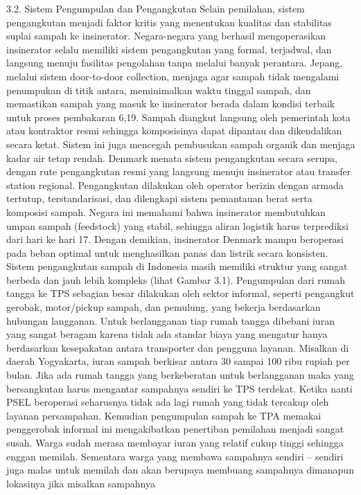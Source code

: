 \documentclass[
  letterpaper,
  DIV=11,
  numbers=noendperiod]{scrreprt}
\begin{document}
3.2. Sistem Pengumpulan dan Pengangkutan Selain pemilahan, sistem
pengangkutan menjadi faktor kritis yang menentukan kualitas dan
stabilitas suplai sampah ke insinerator. Negara-negara yang berhasil
mengoperasikan insinerator selalu memiliki sistem pengangkutan yang
formal, terjadwal, dan langsung menuju fasilitas pengolahan tanpa
melalui banyak perantara. Jepang, melalui sistem door-to-door
collection, menjaga agar sampah tidak mengalami penumpukan di titik
antara, meminimalkan waktu tinggal sampah, dan memastikan sampah yang
masuk ke insinerator berada dalam kondisi terbaik untuk proses
pembakaran 6,19. Sampah diangkut langsung oleh pemerintah kota atau
kontraktor resmi sehingga komposisinya dapat dipantau dan dikendalikan
secara ketat. Sistem ini juga mencegah pembusukan sampah organik dan
menjaga kadar air tetap rendah. Denmark menata sistem pengangkutan
secara serupa, dengan rute pengangkutan resmi yang langsung menuju
insinerator atau transfer station regional. Pengangkutan dilakukan oleh
operator berizin dengan armada tertutup, terstandarisasi, dan dilengkapi
sistem pemantauan berat serta komposisi sampah. Negara ini memahami
bahwa insinerator membutuhkan umpan sampah (feedstock) yang stabil,
sehingga aliran logistik harus terprediksi dari hari ke hari 17. Dengan
demikian, insinerator Denmark mampu beroperasi pada beban optimal untuk
menghasilkan panas dan listrik secara konsisten. Sistem pengangkutan
sampah di Indonesia masih memiliki struktur yang sangat berbeda dan jauh
lebih kompleks (lihat Gambar 3.1). Pengumpulan dari rumah tangga ke TPS
sebagian besar dilakukan oleh sektor informal, seperti pengangkut
gerobak, motor/pickup sampah, dan pemulung, yang bekerja berdasarkan
hubungan langganan. Untuk berlangganan tiap rumah tangga dibebani iuran
yang sangat beragam karena tidak ada standar biaya yang mengatur hanya
berdasarkan kesepakatan antara transporter dan pengguna layanan.
Misalkan di daerah Yogyakarta, iuran sampah berkisar antara 30 sampai
100 ribu rupiah per bulan. Jika ada rumah tangga yang berkeberatan untuk
berlangganan maka yang bersangkutan harus mengantar sampahnya sendiri ke
TPS terdekat. Ketika nanti PSEL beroperasi seharusnya tidak ada lagi
rumah yang tidak tercakup oleh layanan persampahan. Kemudian pengumpulan
sampah ke TPA memakai penggerobak informal ini mengakibatkan penertiban
pemilahan menjadi sangat susah. Warga sudah merasa membayar iuran yang
relatif cukup tinggi sehingga enggan memilah. Sementara warga yang
membawa sampahnya sendiri -- sendiri juga malas untuk memilah dan akan
berupaya membuang sampahnya dimanapun lokasinya jika misalkan sampahnya
\end{document}
